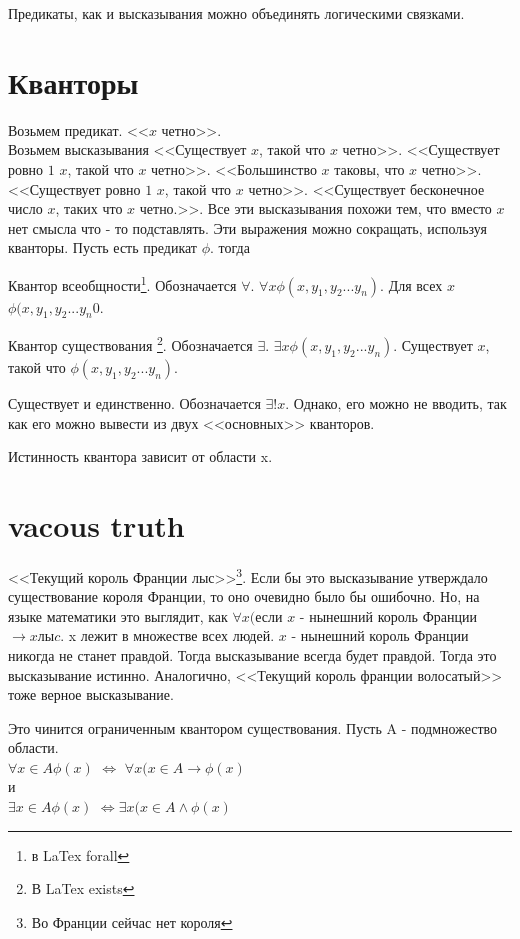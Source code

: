 \documentclass[a4paper,12pt]{article}
\begin{document}
Предикаты, как и высказывания можно объединять логическими связками. 

\section{Кванторы}
Возьмем предикат.  <<$x$ четно>>. \\
Возьмем высказывания <<Существует $x$, такой что $x$ четно>>. <<Существует ровно $1$ $x$, такой что $x$ четно>>. <<Большинство $x$ таковы, что $x$ четно>>. <<Существует ровно $1$ $x$, такой что $x$ четно>>. <<Существует бесконечное число $x$, таких что $x$ четно.>>. Все эти высказывания похожи тем, что вместо $x$ нет смысла что - то подставлять. Эти выражения можно сокращать, используя кванторы. Пусть есть предикат $\phi$. тогда

Квантор всеобщности\footnote{в LaTex forall}. Обозначается $\forall$. $\forall x \phi(x, y_1, y_2...y_n)$. Для всех $x$ $\phi(x, y_1, y_2...y_n0$. 

Квантор существования \footnote{В LaTex exists}. Обозначается $\exists$. $\exists x \phi(x, y_1, y_2...y_n)$. Существует $x$, такой что $\phi(x, y_1, y_2...y_n)$.

Существует и единственно. Обозначается $\exists !x$. Однако, его можно не вводить, так как его можно вывести из двух <<основных>> кванторов.

Истинность квантора зависит от области x.
\section{vacous truth}
<<Текущий король Франции лыс>>\footnote{Во Франции сейчас нет короля}. Если бы это высказывание утверждало существование короля Франции, то оно очевидно было бы ошибочно. Но, на языке математики это выглядит, как $\forall x($если $x$ - нынешний король Франции $\rightarrow x лыc$. x лежит в множестве всех людей. $x$ - нынешний король Франции никогда не станет правдой. Тогда высказывание всегда будет правдой. Тогда это высказывание истинно. Аналогично, <<Текущий король франции волосатый>> тоже верное высказывание. 

Это чинится ограниченным квантором существования.
Пусть A - подмножество области. \\
$\forall x \in A \phi (x)$ $\Leftrightarrow$ $\forall x(x \in A \rightarrow \phi (x)$\\
и\\
$\exists x \in A \phi(x)$ $\Leftrightarrow \exists x(x \in A \wedge \phi (x)$
\end{document}
